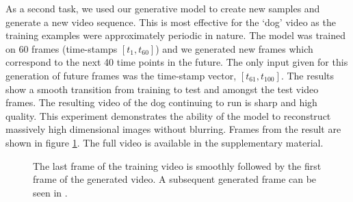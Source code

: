 \documentclass [10pt , a4paper]{article}
\begin{document}
\par As a second task, we used our generative model to create new
samples and generate a new video sequence. This is most effective for
the `dog' video as the training examples were approximately periodic
in nature. The model was trained on 60 frames (time-stamps $[t_1,
t_{60}]$) and we generated new frames which correspond to the next
40 time points in the future. The only input given for this generation
of future frames was the time-stamp vector, $[t_{61}, t_{100}]$. The
results show a smooth transition from training to test and amongst the
test video frames. The resulting video of the dog continuing to run is
sharp and high quality. This experiment demonstrates the ability of
the model to reconstruct massively high dimensional images without
blurring. Frames from the result are shown in figure
\ref{fig:dog}. The full video is available in the supplementary
material.


\begin{figure}[ht]
\begin{center}
\end{center}
\caption{ \small{
The last frame of the training video  is smoothly followed by the first frame  of the generated video. A subsequent generated frame can be seen in }.}
\label{fig:dog}
\end{figure}






\end{document}
